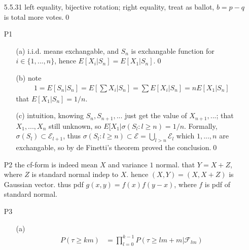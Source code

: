 \documentclass[paper=a4, fontsize=11pt]{scrartcl} %
\numberwithin{equation}{section} %
\numberwithin{figure}{section} %
\numberwithin{table}{section} %
\def \var {\text{Var}}
\begin{document}
\begin{itemize}
\begin{itemize}
		\begin{align}
			E[h] &= E[\frac{(x-y)^2}{2}]\\
				&= E[t^2-(E[t])^2]\\
				&= \var(\xi)= \sigma^2
		\end{align}
		and recall Hewitt-Savage 0-1 law, thus $W_{-n}\stackrel{a.s.}{\rightarrow} \sigma^2$.\qed
		\item[(b)] check formal solution (however, since $W_n$ converge, easily get $E[W_{-n}^2]\rightarrow E[W_{-\infty}]^2=(E[h])^2$)
	\end{itemize}
	\item[5.5.31] left equality, bijective rotation; right equality, treat as ballot, $b=p-q$ is total more votes.\qed
	\item[P1]
	\begin{itemize}
		\item[(a)] i.i.d. means exchangable, and $S_n$ is exchangable function for $i\in\{1,...,n\}$, hence $E[X_i|S_n] = E[X_1|S_n]$.\qed
		\item[(b)] note 
		\begin{align}
			1 = E[S_n|S_n] = E[\sum X_i|S_n] = \sum E[X_i|S_n] = n E[X_1|S_n]
		\end{align}
		that $E[X_1|S_n]=1/n$.
		\item[(c)] intuition, knowing $S_n,S_{n+1},...$ just get the value of $X_{n+1},...$; that $X_1,...,X_n$ still unknown, so $E[X_1|\sigma(S_l:l\geq n)=1/n$. Formally, $\sigma(S_l)\subset \mathcal{E}_{l+1}$, thus $\sigma(S_l:l\geq n) \subset \mathcal{E} = \bigcup_{l>n} \mathcal{E}_l$ which $1,...,n$ are exchangable, so by de Finetti's theorem proved the conclusion.\qed
	\end{itemize}
	\item[P2] the cf-form is indeed mean $X$ and variance $1$ normal. that $Y=X+Z$, where $Z$ is standard normal indep to $X$. hence $(X,Y)=(X,X+Z)$ is Gaussian vector. thus pdf $g(x,y)= f(x)f(y-x)$, where $f$ is pdf of standard normal.
	\item[P3]
	\begin{itemize}
		\item[(a)]
		\begin{align}
			P(\tau\geq km) &= \prod_{l=0}^{k-1}P(\tau\geq lm+m  |\mathcal{F}_{lm})\\

\end{align}
\end{itemize}
\end{itemize}
\end{document}
